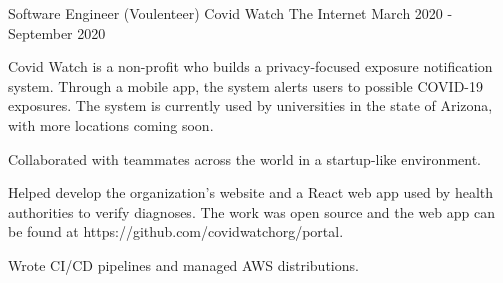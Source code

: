 

\begin{cventries}

  \cventry
  {Software Engineer (Voulenteer)} %
    {Covid Watch} %
    {The Internet}
    {March 2020 - September 2020 } %
    {
      \begin{cvitems} %
      \item {Covid Watch is a non-profit who builds a privacy-focused exposure notification system. Through a mobile app, the system alerts users to possible COVID-19 exposures. The system is currently used by universities in the state of Arizona, with more locations coming soon.}
      \item{Collaborated with teammates across the world in a startup-like environment.}
      \item {Helped develop the organization's website and a React web app used by health authorities to verify diagnoses. The work was open source and the web app can be found at https://github.com/covidwatchorg/portal.}
      \item {Wrote CI/CD pipelines and managed AWS distributions.}
      \end{cvitems}
    }


\end{cventries}
